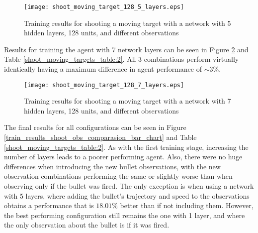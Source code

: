 \begin{figure}
    \begin{center}
        \texttt{[image: shoot\_moving\_target\_128\_5\_layers.eps]}
        \caption{Training results for shooting a moving target with a network with 5 hidden layers, 128 units, and different observations}
        \label{train_results_shoot_obs_comparasion_5_layers}
    \end{center}
\end{figure}

Results for training the agent with 7 network layers can be seen in Figure \ref{train_results_shoot_obs_comparasion_7_layers} and Table \ref{shoot_moving_targets_table:2}. All 3 combinations perform virtually identically having a maximum difference in agent performance of $\sim3\%$.

\begin{figure}
    \begin{center}
        \texttt{[image: shoot\_moving\_target\_128\_7\_layers.eps]}
        \caption{Training results for shooting a moving target with a network with 7 hidden layers, 128 units, and different observations}
        \label{train_results_shoot_obs_comparasion_7_layers}
    \end{center}
\end{figure}


The final results for all configurations can be seen in Figure \ref{train_results_shoot_obs_comparasion_bar_chart} and Table \ref{shoot_moving_targets_table:2}. As with the first training stage, increasing the number of layers leads to a poorer performing agent. Also, there were no huge differences when introducing the new bullet observations, with the new observation combinations performing the same or slightly worse than when observing only if the bullet was fired. The only exception is when using a network with 5 layers, where adding the bullet's trajectory and speed to the observations obtains a performance that is $18.01\%$ better than if not including them. However, the best performing configuration still remains the one with 1 layer, and where the only observation about the bullet is if it was fired.

